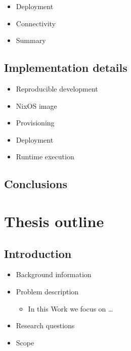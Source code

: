 \begin{itemize}
\tightlist
\item
  Deployment
\item
  Connectivity
\item
  Summary
\end{itemize}

\hypertarget{implementation-details}{%
\section{Implementation details}\label{implementation-details}}

\begin{itemize}
\tightlist
\item
  Reproducible development
\item
  NixOS image
\item
  Provisioning
\item
  Deployment
\item
  Runtime execution
\end{itemize}

\hypertarget{conclusions}{%
\section{Conclusions}\label{conclusions}}

\hypertarget{thesis-outline}{%
\chapter{Thesis outline}\label{thesis-outline}}

\hypertarget{introduction}{%
\section{Introduction}\label{introduction}}

\begin{itemize}
\tightlist
\item
  Background information
\item
  Problem description

  \begin{itemize}
  \tightlist
  \item
    In this Work we focus on \ldots{}
  \end{itemize}
\item
  Research questions
\item
  Scope
\end{itemize}

